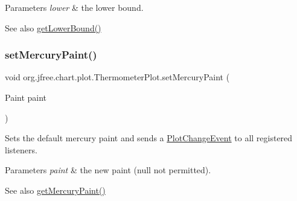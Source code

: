 \begin{DoxyParams}{Parameters}
{\em lower} & the lower bound.\\
\hline
\end{DoxyParams}
\begin{DoxySeeAlso}{See also}
\mbox{\hyperlink{classorg_1_1jfree_1_1chart_1_1plot_1_1_thermometer_plot_aaf4768e80d5df9af624c7c1e83dc8d75}{get\+Lower\+Bound()}} 
\end{DoxySeeAlso}
\mbox{\label{classorg_1_1jfree_1_1chart_1_1plot_1_1_thermometer_plot_a99271f8834744a4540a8ea4c0287104b}} 
\subsubsection{\texorpdfstring{set\+Mercury\+Paint()}{setMercuryPaint()}}
{\footnotesize\ttfamily void org.\+jfree.\+chart.\+plot.\+Thermometer\+Plot.\+set\+Mercury\+Paint (\begin{DoxyParamCaption}\item[{Paint}]{paint }\end{DoxyParamCaption})}

Sets the default mercury paint and sends a \mbox{\hyperlink{}{Plot\+Change\+Event}} to all registered listeners.


\begin{DoxyParams}{Parameters}
{\em paint} & the new paint ({\ttfamily null} not permitted).\\
\hline
\end{DoxyParams}
\begin{DoxySeeAlso}{See also}
\mbox{\hyperlink{classorg_1_1jfree_1_1chart_1_1plot_1_1_thermometer_plot_ad191d4305e54736ab1cf978c8da62266}{get\+Mercury\+Paint()}} 
\end{DoxySeeAlso}
\mbox{\label{classorg_1_1jfree_1_1chart_1_1plot_1_1_thermometer_plot_aca84c9a7372af7b31ae1845629f22c15}} 
